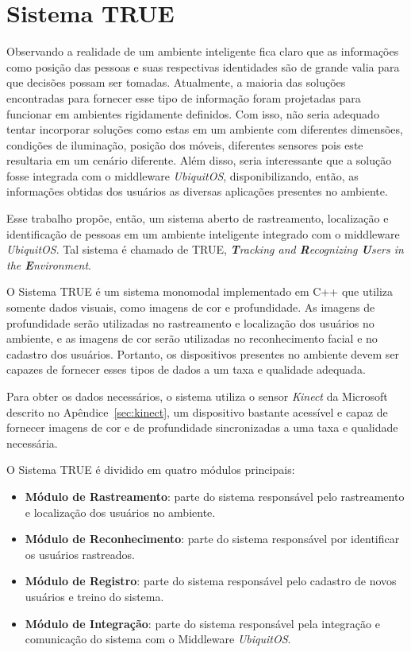 \chapter{Sistema TRUE}

Observando a realidade de um ambiente inteligente fica claro que as informações como posição das pessoas e suas respectivas identidades são de grande valia para que decisões possam ser tomadas. Atualmente, a maioria das soluções encontradas para fornecer esse tipo de informação foram projetadas para funcionar em ambientes rigidamente definidos. Com isso, não seria adequado tentar incorporar soluções como estas em um ambiente com diferentes dimensões, condições de iluminação, posição dos móveis, diferentes sensores pois este resultaria em um cenário diferente. Além disso, seria interessante que a solução fosse integrada com o middleware \textit{UbiquitOS}, disponibilizando, então, as informações obtidas dos usuários as diversas aplicações presentes no ambiente.


Esse trabalho propõe, então, um sistema aberto de rastreamento, localização e identificação de pessoas em um ambiente inteligente integrado com o middleware \textit{UbiquitOS}. Tal sistema é chamado de TRUE, \textit{\textbf{T}racking and \textbf{R}ecognizing \textbf{U}sers in the \textbf{E}nvironment}.

O Sistema TRUE é um sistema monomodal implementado em C++ que utiliza somente dados visuais, como imagens de cor e profundidade. As imagens de profundidade serão utilizadas no rastreamento e localização dos usuários no ambiente, e as imagens de cor serão utilizadas no reconhecimento facial e no cadastro dos usuários. Portanto, os dispositivos presentes no ambiente devem ser capazes de fornecer esses tipos de dados a um taxa e qualidade adequada. 

Para obter os dados necessários, o sistema utiliza o sensor \textit{Kinect} da Microsoft descrito no Apêndice~\ref{sec:kinect}, um dispositivo bastante acessível e capaz de fornecer imagens de cor e de profundidade sincronizadas a uma taxa e qualidade necessária.

O Sistema TRUE é dividido em quatro módulos principais:

	\begin{itemize}
		\item \textbf{Módulo de Rastreamento}: parte do sistema responsável pelo rastreamento e localização dos usuários no ambiente.
		\item \textbf{Módulo de Reconhecimento}: parte do sistema responsável por identificar os usuários rastreados.
		\item \textbf{Módulo de Registro}: parte do sistema responsável pelo cadastro de novos usuários e treino do sistema.
		\item \textbf{Módulo de Integração}: parte do sistema responsável pela integração e comunicação do sistema com o Middleware \textit{UbiquitOS}.
	\end{itemize}


